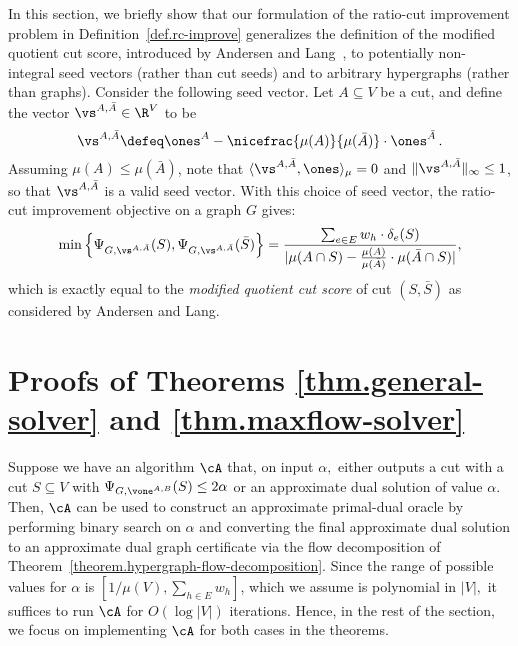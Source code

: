 \documentclass[letterpaper]{article}
\begin{document}
In this section, we briefly show that our formulation of the ratio-cut improvement problem in Definition~\ref{def.rc-improve} generalizes  the definition of the modified quotient cut score, introduced by Andersen and Lang~\cite{Andersen-Lang}, to potentially non-integral seed vectors (rather than cut seeds) and to arbitrary hypergraphs (rather than graphs).
Consider the following seed vector. Let $A \subseteq V$ be a cut, and define the vector $\vs^{A,\bar{A}} \in \R^V$ to be
\begin{equation}
\label{def.seed-vector}
\vs^{A,\bar{A}} \defeq \ones^A - \nicefrac{\mu(A)}{\mu(\bar{A})} \cdot \ones^{\bar{A}} \, .
\end{equation}
Assuming $\mu(A) \leq \mu(\bar{A})$, note that $\langle \vs^{A,\bar{A}}, \ones \rangle_{\mu} = 0$ and $\lVert \vs^{A,\bar{A}} \rVert_{\infty} \leq 1$, so that $\vs^{A,\bar{A}}$ is a valid seed vector. With this choice of seed vector, the ratio-cut improvement objective on a graph $G$ gives:
\begin{equation*}
\min\left\{\Psi_{G, \vs^{A,\bar{A}}}(S), \Psi_{G, \vs^{A,\bar{A}}}(\bar{S})\right\}
= \frac{\sum_{e \in E} w_h \cdot \delta_e(S)}{\lvert \mu(A \cap S) - \frac{\mu(A)}{\mu(\bar{A})} \cdot \mu(\bar{A} \cap S) \rvert},
\end{equation*}
which is exactly equal to the \emph{modified quotient cut score} of cut $(S,\bar{S})$ as considered by Andersen and Lang.
 \section{Proofs of Theorems \ref{thm.general-solver} and \ref{thm.maxflow-solver}}
\label{sec.appendix.ci-algs}

Suppose we have an algorithm $\cA$ that,  on input $\alpha,$ either outputs a cut with a cut $S \subseteq V$ with $\Psi_{G,\vone^{A,B}}(S) \leq 2\alpha$ or an approximate dual solution of value $\alpha.$ Then, $\cA$ can be used to construct an approximate primal-dual oracle by performing binary search on $\alpha$ and converting the final approximate dual solution to an approximate dual graph certificate via the flow decomposition of Theorem~\ref{theorem.hypergraph-flow-decomposition}. Since the range of possible values for $\alpha$ is $[1/\mu(V),\sum_{h\in E} w_h]$, which we assume is polynomial in $|V|,$ it suffices to run $\cA$ for $O(\log |V|)$ iterations.
Hence, in the rest of the section, we focus on implementing $\cA$ for both cases in the theorems.
\end{document}
